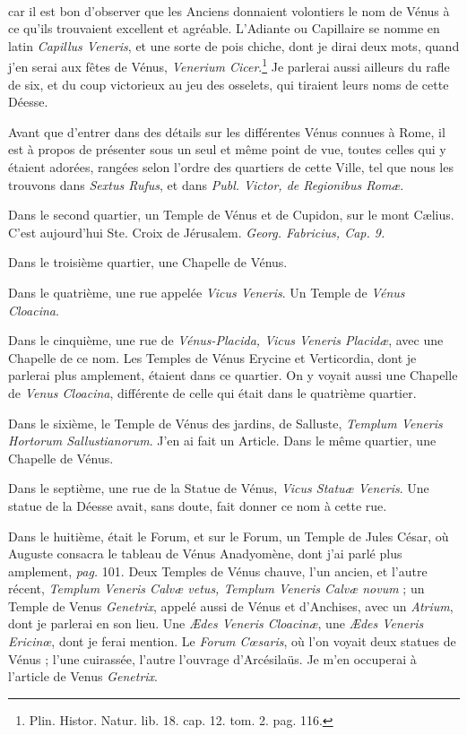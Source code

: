 \documentclass[a4paper, 18pt, oneside]{article}
\begin{document}
\paragraph{}
car il est bon d'observer que les Anciens donnaient volontiers le nom de Vénus à ce qu'ils trouvaient excellent et agréable. L'Adiante ou Capillaire se nomme en latin \emph{Capillus Veneris}, et une sorte de pois chiche, dont je dirai deux mots, quand j'en serai aux fêtes de Vénus, \emph{Venerium Cicer}.\footnote{Plin. Histor. Natur. lib. 18. cap. 12. tom. 2. pag. 116.} Je parlerai aussi ailleurs du rafle de six, et du coup victorieux au jeu des osselets, qui tiraient leurs noms de cette Déesse.

Avant que d'entrer dans des détails sur les différentes Vénus connues à Rome, il est à propos de présenter sous un seul et même point de vue, toutes celles qui y étaient adorées, rangées selon l'ordre des quartiers de cette Ville, tel que nous les trouvons dans \emph{Sextus Rufus}, et dans \emph{Publ. Victor, de Regionibus Romæ}.

Dans le second quartier, un Temple de Vénus et de Cupidon, sur le mont Cælius. C'est aujourd'hui Ste. Croix de Jérusalem. \emph{Georg. Fabricius, Cap. 9.}

Dans le troisième quartier, une Chapelle de Vénus.

Dans le quatrième, une rue appelée \emph{Vicus Veneris}. Un Temple de \emph{Vénus Cloacina}.

Dans le cinquième, une rue de \emph{Vénus-Placida, Vicus Veneris Placidæ}, avec une Chapelle de ce nom. Les Temples de Vénus Erycine et Verticordia, dont je parlerai plus amplement, étaient dans ce quartier. On y voyait aussi une Chapelle de \emph{Venus Cloacina}, différente de celle qui était dans le quatrième quartier.

Dans le sixième, le Temple de Vénus des jardins, de Salluste, \emph{Templum Veneris Hortorum Sallustianorum}. J'en ai fait un Article. Dans le même quartier, une Chapelle de Vénus.

Dans le septième, une rue de la Statue de Vénus, \emph{Vicus Statuæ Veneris}. Une statue de la Déesse avait, sans doute, fait donner ce nom à cette rue.

Dans le huitième, était le Forum, et sur le Forum, un Temple de Jules César, où Auguste consacra le tableau de Vénus Anadyomène, dont j'ai parlé plus amplement, \emph{pag.} 101. Deux Temples de Vénus chauve, l'un ancien, et l'autre récent, \emph{Templum Veneris Calvæ vetus, Templum Veneris Calvæ novum} ; un Temple de Venus \emph{Genetrix}, appelé aussi de Vénus et d'Anchises, avec un \emph{Atrium}, dont je parlerai en son lieu. Une \emph{Ædes Veneris Cloacinæ}, une \emph{Ædes Veneris Ericinœ}, dont je ferai mention. Le \emph{Forum Cœsaris}, où l'on voyait deux statues de Vénus ; l'une cuirassée, l'autre l'ouvrage d'Arcésilaüs. Je m'en occuperai à l'article de Venus \emph{Genetrix}.
\end{document}

